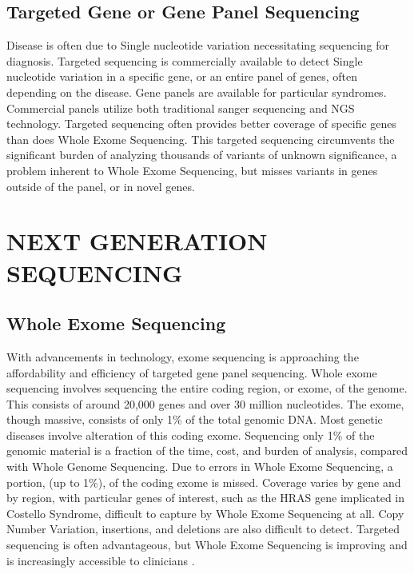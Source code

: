 \documentclass[sigconf]{acmart}
\begin{document}
\subsection{Targeted Gene or Gene Panel Sequencing}
Disease is often due to Single nucleotide variation necessitating sequencing for diagnosis.  Targeted sequencing is commercially available to detect Single nucleotide variation in a specific gene, or an entire panel of  genes, often depending on the disease.  Gene panels are available for particular syndromes. Commercial panels utilize both traditional sanger sequencing and NGS technology.  Targeted sequencing often provides better coverage of specific genes than does Whole Exome Sequencing. This targeted sequencing circumvents the significant burden of analyzing thousands of variants of unknown significance, a problem inherent to Whole Exome Sequencing, but misses variants in genes outside of the panel, or in novel genes.

\section{NEXT GENERATION SEQUENCING}

\subsection{Whole Exome Sequencing}
With advancements in technology, exome sequencing is approaching the affordability and efficiency of targeted gene panel sequencing.  Whole exome sequencing involves sequencing the entire coding region, or exome, of the genome.  This consists of around 20,000 genes and over 30 million nucleotides.  The exome, though massive, consists of only 1\% of the total genomic DNA.  Most genetic diseases involve alteration of this coding exome.  Sequencing only 1\% of the genomic material is a fraction of the time, cost, and burden of analysis, compared with Whole Genome Sequencing. Due to errors in Whole Exome Sequencing, a portion, (up to 1\%), of the coding exome is missed.   Coverage varies by gene and by region, with particular genes of interest, such as the HRAS gene implicated in Costello Syndrome, difficult to capture by Whole Exome Sequencing at all. Copy Number Variation, insertions, and deletions are also difficult to detect. Targeted sequencing is often advantageous, but Whole Exome Sequencing is improving and is increasingly accessible to clinicians \cite{yang2013clinical}.
\end{document}
